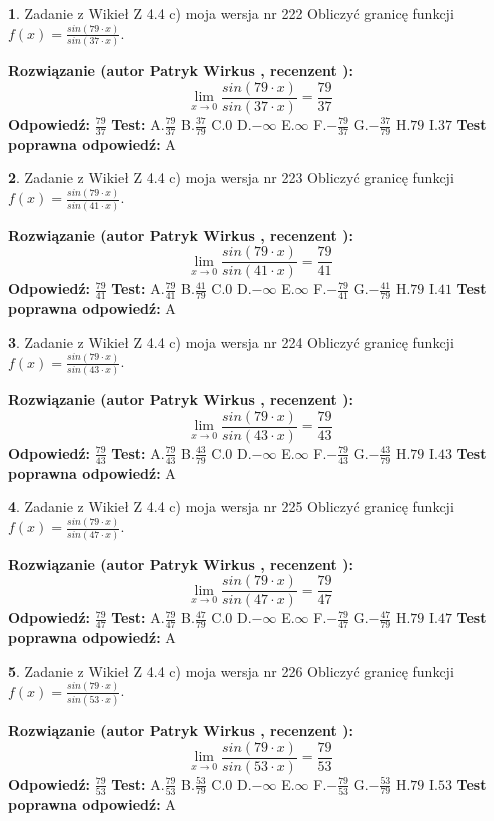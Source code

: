 \documentclass[12pt, a4paper]{article}
\theoremstyle{definition} %
\newtheorem{zad}{}
\newcommand{\zadStart}[1]{\begin{zad}#1\newline}
\newcommand{\zadStop}{\end{zad}}
\newcommand{\rozwStart}[2]{\noindent \textbf{Rozwiązanie (autor #1 , recenzent #2): }\newline}
\newcommand{\rozwStop}{\newline}
\newcommand{\odpStart}{\noindent \textbf{Odpowiedź:}\newline}
\newcommand{\odpStop}{\newline}
\newcommand{\testStart}{\noindent \textbf{Test:}\newline}
\newcommand{\testStop}{\newline}
\newcommand{\kluczStart}{\noindent \textbf{Test poprawna odpowiedź:}\newline}
\newcommand{\kluczStop}{\newline}
\begin{document}
\zadStart{Zadanie z Wikieł Z 4.4 c) moja wersja nr 222}
Obliczyć granicę funkcji $f(x)=\frac{sin(79\cdot x)}{sin(37\cdot x)}$.
\zadStop
\rozwStart{Patryk Wirkus}{}
$$\lim\limits_{x\to 0}\frac{sin(79\cdot x)}{sin(37\cdot x)}=
\frac{79}{37}$$
\rozwStop
\odpStart
$\frac{79}{37}$
\odpStop
\testStart
A.$\frac{79}{37}$
B.$\frac{37}{79}$
C.$0$
D.$-\infty$
E.$\infty$
F.$-\frac{79}{37}$
G.$-\frac{37}{79}$
H.$79$
I.$37$
\testStop
\kluczStart
A
\kluczStop



\zadStart{Zadanie z Wikieł Z 4.4 c) moja wersja nr 223}
Obliczyć granicę funkcji $f(x)=\frac{sin(79\cdot x)}{sin(41\cdot x)}$.
\zadStop
\rozwStart{Patryk Wirkus}{}
$$\lim\limits_{x\to 0}\frac{sin(79\cdot x)}{sin(41\cdot x)}=
\frac{79}{41}$$
\rozwStop
\odpStart
$\frac{79}{41}$
\odpStop
\testStart
A.$\frac{79}{41}$
B.$\frac{41}{79}$
C.$0$
D.$-\infty$
E.$\infty$
F.$-\frac{79}{41}$
G.$-\frac{41}{79}$
H.$79$
I.$41$
\testStop
\kluczStart
A
\kluczStop



\zadStart{Zadanie z Wikieł Z 4.4 c) moja wersja nr 224}
Obliczyć granicę funkcji $f(x)=\frac{sin(79\cdot x)}{sin(43\cdot x)}$.
\zadStop
\rozwStart{Patryk Wirkus}{}
$$\lim\limits_{x\to 0}\frac{sin(79\cdot x)}{sin(43\cdot x)}=
\frac{79}{43}$$
\rozwStop
\odpStart
$\frac{79}{43}$
\odpStop
\testStart
A.$\frac{79}{43}$
B.$\frac{43}{79}$
C.$0$
D.$-\infty$
E.$\infty$
F.$-\frac{79}{43}$
G.$-\frac{43}{79}$
H.$79$
I.$43$
\testStop
\kluczStart
A
\kluczStop



\zadStart{Zadanie z Wikieł Z 4.4 c) moja wersja nr 225}
Obliczyć granicę funkcji $f(x)=\frac{sin(79\cdot x)}{sin(47\cdot x)}$.
\zadStop
\rozwStart{Patryk Wirkus}{}
$$\lim\limits_{x\to 0}\frac{sin(79\cdot x)}{sin(47\cdot x)}=
\frac{79}{47}$$
\rozwStop
\odpStart
$\frac{79}{47}$
\odpStop
\testStart
A.$\frac{79}{47}$
B.$\frac{47}{79}$
C.$0$
D.$-\infty$
E.$\infty$
F.$-\frac{79}{47}$
G.$-\frac{47}{79}$
H.$79$
I.$47$
\testStop
\kluczStart
A
\kluczStop



\zadStart{Zadanie z Wikieł Z 4.4 c) moja wersja nr 226}
Obliczyć granicę funkcji $f(x)=\frac{sin(79\cdot x)}{sin(53\cdot x)}$.
\zadStop
\rozwStart{Patryk Wirkus}{}
$$\lim\limits_{x\to 0}\frac{sin(79\cdot x)}{sin(53\cdot x)}=
\frac{79}{53}$$
\rozwStop
\odpStart
$\frac{79}{53}$
\odpStop
\testStart
A.$\frac{79}{53}$
B.$\frac{53}{79}$
C.$0$
D.$-\infty$
E.$\infty$
F.$-\frac{79}{53}$
G.$-\frac{53}{79}$
H.$79$
I.$53$
\testStop
\kluczStart
A
\kluczStop
\end{document}
